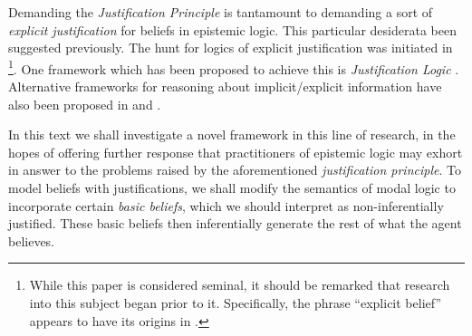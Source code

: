 \documentclass[11pt]{article}
\numberwithin{equation}{subsection}
\begin{document}

Demanding the \emph{Justification Principle} is tantamount to demanding
a sort of \emph{explicit justification} for beliefs in epistemic
logic. This particular desiderata 
been suggested previously. The hunt for logics of
explicit justification was initiated in
\citet{van_benthem_reflectionsepistemic_1991}\footnote{While this
  paper is considered seminal, it should be remarked that research
  into this subject began prior to it.  Specifically, the
  phrase ``explicit belief'' appears to have its origins in
  \citep{levesque_logic_1984}.}. One framework which has been proposed
to achieve this is \emph{Justification Logic}
\citep{artemov_introducing_2005,artemov_justification_2007,fitting_logic_2004,fitting_logic_2005}.
Alternative frameworks for reasoning about implicit/explicit
information have also been proposed in \citet{van_benthem_inference_2009} and
\citet{velzquez-quesada_inference_2009}.

In this text we shall investigate a novel framework in this line of research, in the hopes of
offering further response that practitioners of epistemic logic may
exhort in answer to the problems raised by the aforementioned 
\emph{justification principle}.  
To model beliefs with justifications, we shall modify the semantics of
modal logic to incorporate  certain \emph{basic beliefs}, which we
should interpret as non-inferentially  justified.  
These basic beliefs then inferentially generate the rest  of what the
agent believes.
\end{document}
